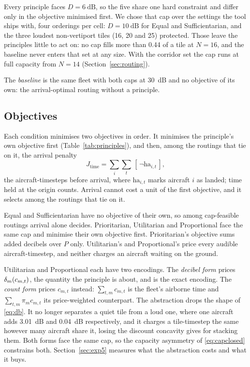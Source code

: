 Every principle faces $D=\SI{6}{\dB}$, so the five share one hard constraint and differ
only in the objective minimised first. We chose that cap over the settings the tool ships
with, four orderings per cell: $D=\SI{10}{\dB}$ for Equal and Sufficientarian, and the
three loudest non-vertiport tiles (16, 20 and 25) protected. Those leave the principles
little to act on: no cap fills more than 0.44 of a tile at $N=16$, and the baseline never
enters that set at any size. With the corridor set the cap runs at full capacity from
$N=14$ (Section~\ref{sec:routing}).

The \emph{baseline} is the same fleet with both caps at \SI{30}{\dB} and no objective of
its own: the arrival-optimal routing without a principle.

\subsection{Objectives}
\label{sec:objectives}

Each condition minimises two objectives in order. It minimises the principle's own
objective first (Table~\ref{tab:principles}), and then, among the routings that tie on
it, the arrival penalty
\begin{equation}
J_{\mathrm{time}}=\textstyle\sum_{i}\sum_{t}\,[\,\neg\mathrm{ha}_{i,t}\,] ,
\label{eq:jtime}
\end{equation}
the aircraft-timesteps before arrival, where $\mathrm{ha}_{i,t}$ marks aircraft $i$ as
landed; time held at the origin counts. Arrival cannot cost a unit of the first
objective, and it selects among the routings that tie on it.

Equal and Sufficientarian have no objective of their own, so among cap-feasible routings
arrival alone decides. Prioritarian, Utilitarian and Proportional face the same cap and
minimise their own objective first. Prioritarian's objective sums added decibels over $P$ only.
Utilitarian's and Proportional's price every audible aircraft-timestep, and neither
charges an aircraft waiting on the ground.

Utilitarian and Proportional each have two encodings. The \emph{decibel form} prices
$\delta_m(c_{m,t})$, the quantity the principle is about, and is the exact encoding. The
\emph{count form} prices $c_{m,t}$ instead: $\sum_{t,m}c_{m,t}$ is the fleet's airborne
time and $\sum_{t,m}\pi_m c_{m,t}$ its price-weighted counterpart. The abstraction drops
the shape of \eqref{eq:db}. It no longer separates a quiet tile from a loud one, where one
aircraft adds \SI{3.01}{\dB} and \SI{0.04}{\dB} respectively, and it charges a
tile-timestep the same however many aircraft share it, losing the discount concavity
gives for stacking them. Both forms face
the same cap, so the capacity asymmetry of \eqref{eq:capclosed} constrains both.
Section~\ref{sec:exp5} measures what the abstraction costs and what it buys.


